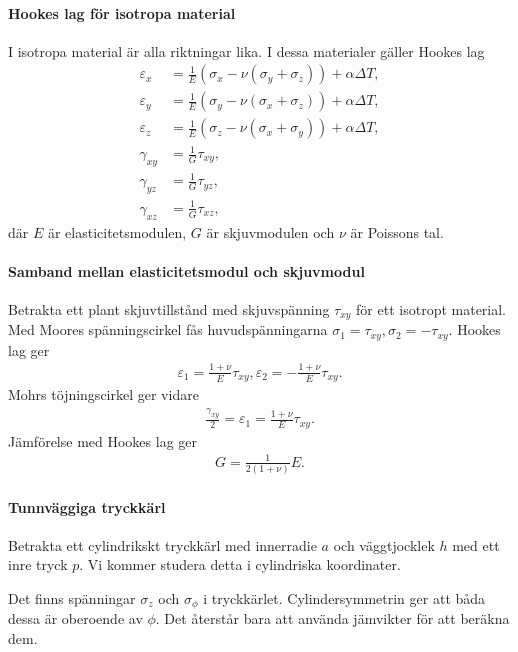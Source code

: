 \paragraph{Hookes lag för isotropa material}
I isotropa material är alla riktningar lika. I dessa materialer gäller Hookes lag
\begin{align*}
	\varepsilon_{x} &= \frac{1}{E}(\sigma_{x} - \nu(\sigma_{y} + \sigma_{z})) + \alpha\Delta T, \\
	\varepsilon_{y} &= \frac{1}{E}(\sigma_{y} - \nu(\sigma_{x} + \sigma_{z})) + \alpha\Delta T, \\
	\varepsilon_{z} &= \frac{1}{E}(\sigma_{z} - \nu(\sigma_{x} + \sigma_{y})) + \alpha\Delta T, \\
	\gamma_{xy}     &= \frac{1}{G}\tau_{xy}, \\
	\gamma_{yz}     &= \frac{1}{G}\tau_{yz}, \\
	\gamma_{xz}     &= \frac{1}{G}\tau_{xz},
\end{align*}
där $E$ är elasticitetsmodulen, $G$ är skjuvmodulen och $\nu$ är Poissons tal.

\paragraph{Samband mellan elasticitetsmodul och skjuvmodul}
Betrakta ett plant skjuvtillstånd med skjuvspänning $\tau_{xy}$ för ett isotropt material. Med Moores spänningscirkel fås huvudspänningarna $\sigma_{1} = \tau_{xy}, \sigma_{2} = -\tau_{xy}$. Hookes lag ger
\begin{align*}
	\varepsilon_{1} = \frac{1 + \nu}{E}\tau_{xy}, \varepsilon_{2} = -\frac{1 + \nu}{E}\tau_{xy}.
\end{align*}
Mohrs töjningscirkel ger vidare
\begin{align*}
	\frac{\gamma_{xy}}{2} = \varepsilon_{1} = \frac{1 + \nu}{E}\tau_{xy}.
\end{align*}
Jämförelse med Hookes lag ger
\begin{align*}
	G = \frac{1}{2(1 + \nu)}E.
\end{align*}

\paragraph{Tunnväggiga tryckkärl}
Betrakta ett cylindrikskt tryckkärl med innerradie $a$ och väggtjocklek $h$ med ett inre tryck $p$. Vi kommer studera detta i cylindriska koordinater.

Det finns spänningar $\sigma_{z}$ och $\sigma_{\phi}$ i tryckkärlet. Cylindersymmetrin ger att båda dessa är oberoende av $\phi$. Det återstår bara att använda jämvikter för att beräkna dem.

